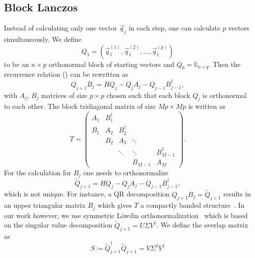 \subsection{Block Lanczos}

Instead of calculating only one vector $\vec{q}_j$ in each step,
one can calculate $p$ vectors simultaneously.
We define
\begin{equation}
    Q_1 = (\vec{q}_1^{(1)}, \vec{q}_1^{(2)}, \ldots, \vec{q}_1^{(p)})
\end{equation}
to be an $n\times p$ orthonormal block of starting vectors
and $Q_0 = \mathbb{0}_{n\times q}$.
Then the recurrence relation () can be rewritten as
\begin{equation}
    Q_{j+1} B_j = H Q_j - Q_j A_j - Q_{j-1} B_{j-1}^\dag,
    \label{eq:block-Lanczos-recurrence}
\end{equation}
with $A_j$, $B_j$ matrices of size $p\times p$ chosen such that each block $Q_j$ is orthonormal
to each other.
The block tridiagonal matrix of size $Mp\times Mp$ is written as
\begin{equation}
    T
    =
    \begin{pmatrix}
        A_1 & B_1^\dag &          &         &              \\
        B_1 & A_2      & B_2^\dag &         &              \\
            & B_2      & A_3      & \ddots  &              \\
            &          & \ddots   & \ddots  & B_{M-1}^\dag \\
            &          &          & B_{M-1} & A_M
    \end{pmatrix}.
    \label{eq:tridiagonal-block}
\end{equation}
For the calculation for $B_j$ one needs to orthonormalize
\begin{equation}
    \tilde Q_{j+1} = H Q_j - Q_j A_j - Q_{j-1} B_{j-1}^\dag,
\end{equation}
which is not unique.
For instance, a QR decomposition $Q_{j+1} B_j = \tilde Q_{j+1}$
results in an upper triangular matrix $B_j$
which gives $T$ a compactly banded structure~\cite{Cullum1985, Golub2013}.
In our work however, we use symmetric Löwdin orthonormalization~\cite{Lowdin1950, Brass2021}
which is based on the singular value decomposition
$\tilde Q_{j+1} = U \Sigma V^\dag$.
We define the overlap matrix as
\begin{equation}
    S \coloneqq \tilde Q_{j+1}^\dag \tilde Q_{j+1} = V \Sigma^2 V^\dag
\end{equation}
